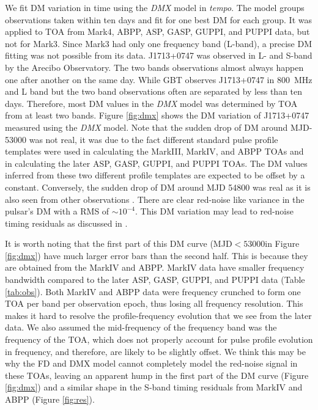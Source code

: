 We fit DM variation in time using the {\it DMX} model in {\it tempo}.
The model groups observations taken within ten days and fit for one
best DM for each group.   
It was applied to TOA from Mark4, ABPP, ASP, GASP, GUPPI, and PUPPI data, but
not for Mark3. Since Mark3 had only one frequency band (L-band), a precise DM
fitting was not possible from its data.
J1713+0747 was observed in L- and S-band by the Arecibo Observatory. The
two bands observations almost always happen one after another on the same day.
While GBT observes J1713+0747 in 800~MHz and L band but the two band
observations often are separated by less than ten days.
Therefore, most DM values in the {\it DMX} model was determined by TOA from at
least two bands. Figure \ref{fig:dmx} shows the DM variation of J1713+0747 
measured using the {\it DMX} model.
Note that the sudden drop of DM around MJD-53000 was not real, it was due to
the fact different standard pulse profile templates were used in calculating the MarkIII, MarkIV, and ABPP TOAs and in calculating the later 
ASP, GASP, GUPPI, and PUPPI TOAs. The DM values inferred from these two different profile templates are expected to be offset by a constant.
Conversely, the sudden drop of DM around MJD 54800 was real as it is also seen from other observations \citep{kcs+13}.
There are clear red-noise like variance in the pulsar's DM with a RMS of
$\sim10^{-4}$. This DM variation may lead to red-noise timing residuals as discussed in \citealt{kcs+13}.

It is worth noting that the first part of this DM curve (MJD$<53000$in
Figure \ref{fig:dmx}) have much larger error bars than the second half.
This is because they are obtained from the 
MarkIV and ABPP. MarkIV data have smaller frequency bandwidth 
compared to the later ASP, GASP, GUPPI, and PUPPI data (Table \ref{tab:obs}).
Both MarkIV and ABPP data were frequency crunched to form one TOA per band per
observation epoch, thus losing all frequency resolution. This makes it hard to
resolve the profile-frequency evolution that we see from the later data. We
also assumed the mid-frequency of the frequency band was the frequency of the
TOA, which does not properly account for pulse profile evolution in frequency, and therefore, are likely to be slightly offset. We think this may be why the FD and
DMX model cannot completely model the red-noise signal in these TOAs, leaving
an apparent hump in the first part of the DM curve (Figure \ref{fig:dmx}) and 
a similar shape in the S-band timing residuals from MarkIV and ABPP (Figure
\ref{fig:res}).


